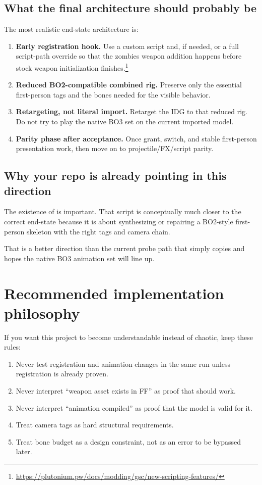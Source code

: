 \documentclass[11pt]{article}
\begin{document}
\subsection{What the final architecture should probably be}

The most realistic end-state architecture is:

\begin{enumerate}
  \item \textbf{Early registration hook.} Use a custom script  and, if needed,  or a full script-path override so that the zombies weapon addition happens before stock weapon initialization finishes.\footnote{\url{https://plutonium.pw/docs/modding/gsc/new-scripting-features/}}
  \item \textbf{Reduced BO2-compatible combined rig.} Preserve only the essential first-person tags and the bones needed for the visible behavior.
  \item \textbf{Retargeting, not literal import.} Retarget the IDG to that reduced rig. Do not try to play the native BO3  set on the current imported model.
  \item \textbf{Parity phase after acceptance.} Once grant, switch, and stable first-person presentation work, then move on to projectile/FX/script parity.
\end{enumerate}

\subsection{Why your repo is already pointing in this direction}

The existence of  is important. That script is conceptually much closer to the correct end-state because it is about synthesizing or repairing a BO2-style first-person skeleton with the right tags and camera chain.

That is a better direction than the current probe path that simply copies  and hopes the native BO3 animation set will line up.

\section{Recommended implementation philosophy}

If you want this project to become understandable instead of chaotic, keep these rules:

\begin{enumerate}
  \item Never test registration and animation changes in the same run unless registration is already proven.
  \item Never interpret ``weapon asset exists in FF'' as proof that  should work.
  \item Never interpret ``animation compiled'' as proof that the model is valid for it.
  \item Treat camera tags as hard structural requirements.
  \item Treat bone budget as a design constraint, not as an error to be bypassed later.
\end{enumerate}
\end{document}
